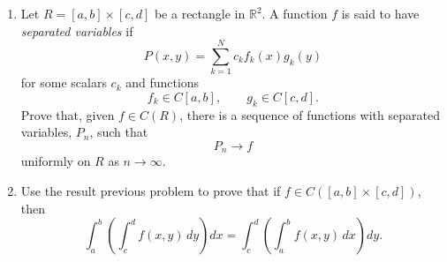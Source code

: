 \begin{problem}
    \vphantom{}
    \begin{enumerate}
    
    \item Let \(R=[a,b]\times[c,d]\) be a rectangle in \(\mathbb{R}^2\). A function \(f\)
    is said to have \emph{separated variables} if
    \[
    P(x,y)=\sum_{k=1}^{N} c_k f_k(x)g_k(y)
    \]
    for some scalars \(c_k\) and functions
    \[
    f_k\in C[a,b],
    \qquad
    g_k\in C[c,d].
    \]
    Prove that, given \(f\in C(R)\), there is a sequence of functions with
    separated variables, \(P_n\), such that
    \[
    P_n\to f
    \]
    uniformly on \(R\) as \(n\to\infty\).
    
    \item Use the result  previous problem to prove that if \(f\in C([a,b]\times[c,d])\), then
    \[
    \int_a^b
    \left(
    \int_c^d f(x,y)\,dy
    \right)dx
    =
    \int_c^d
    \left(
    \int_a^b f(x,y)\,dx
    \right)dy.
    \]
    
    \end{enumerate}

\end{problem}

